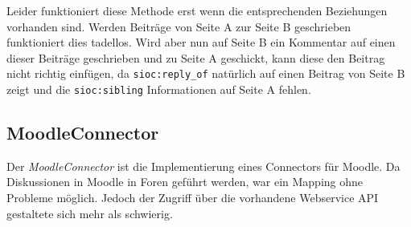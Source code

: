 Leider funktioniert diese Methode erst wenn die entsprechenden Beziehungen vorhanden sind. Werden Beiträge von Seite A zur Seite B geschrieben funktioniert dies tadellos. Wird aber nun auf Seite B ein Kommentar auf einen dieser Beiträge geschrieben und zu Seite A geschickt, kann diese den Beitrag nicht richtig einfügen, da \texttt{sioc:reply\_of} natürlich auf einen Beitrag von Seite B zeigt und die \texttt{sioc:sibling} Informationen auf Seite A fehlen.



\subsection{MoodleConnector} %
\label{sub:moodle_connector}

Der \emph{MoodleConnector} ist die Implementierung eines Connectors für Moodle. Da Diskussionen in Moodle in Foren geführt werden, war ein Mapping ohne Probleme möglich. Jedoch der Zugriff über die vorhandene Webservice API gestaltete sich mehr als schwierig. 



